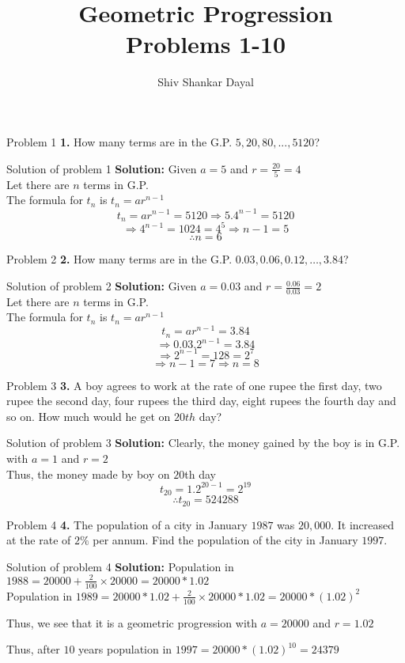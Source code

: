 \documentclass[aspectratio=1610,8pt]{beamer}
\title{Geometric Progression\\Problems 1-10}
\author[Shiv Shankar Dayal]{Shiv Shankar Dayal}
\begin{document}
\begin{frame}
       \titlepage
\end{frame}
\begin{frame}{Problem 1}
  \textbf{1.} How many terms are in the G.P. $5, 20, 80, ..., 5120$?
\end{frame}
\begin{frame}{Solution of problem 1}
  \textbf{Solution:} Given $a = 5$ and $r = \frac{20}{5} = 4$\\
  Let there are $n$ terms in G.P.\\
  The formula for $t_n$ is $t_n = ar^{n - 1}$
  $$t_n = ar^{n - 1} = 5120 \Rightarrow 5.4^{n - 1} = 5120$$
  $$\Rightarrow 4^{n - 1} = 1024 = 4^{5}\Rightarrow n - 1 = 5$$
  $$\therefore n = 6$$
\end{frame}
\begin{frame}{Problem 2}
  \textbf{2.} How many terms are in the G.P. $0.03, 0.06, 0.12, \ldots, 3.84$?
\end{frame}
\begin{frame}{Solution of problem 2}
  \textbf{Solution:} Given $a = 0.03$ and $r = \frac{0.06}{0.03} = 2$\\
  Let there are $n$ terms in G.P.\\
  The formula for $t_n$ is $t_n = ar^{n - 1}$
  $$t_n = ar^{n - 1} = 3.84$$
  $$\Rightarrow 0.03.2^{n - 1} = 3.84$$
  $$\Rightarrow 2^{n - 1} = 128 = 2^7$$
  $$\Rightarrow n -1 = 7 \Rightarrow n = 8$$
\end{frame}
\begin{frame}{Problem 3}
  \textbf{3.} A boy agrees to work at the rate of one rupee the first day, two
  rupee the second day, four rupees the third day, eight rupees the fourth day
  and so on. How much would he get on $20th$ day?
\end{frame}
\begin{frame}{Solution of problem 3}
  \textbf{Solution:} Clearly, the money gained by the boy is in G.P. with $a =
  1$ and $r = 2$\\
  Thus, the money made by boy on $20$th day $$t_{20} = 1.2^{20 -1} = 2^{19}$$
  $$\therefore t_{20} = 524288$$
\end{frame}
\begin{frame}{Problem 4}
  \textbf{4.} The population of a city in January $1987$ was $20,000$. It
  increased at the rate of $2\%$ per annum. Find the population of the city in
  January $1997$.
\end{frame}
\begin{frame}{Solution of problem 4}
  \textbf{Solution:} Population in $1988 = 20000 + \frac{2}{100}\times 20000 =
  20000 * 1.02$\\
  Population in $1989 = 20000*1.02 + \frac{2}{100}\times 20000 * 1.02 =
  20000*(1.02)^2$
  
  Thus, we see that it is a geometric progression with $a = 20000$ and $r =
  1.02$

  Thus, after $10$ years population in $1997 = 20000 * (1.02)^{10} = 24379$
\end{frame}
\end{document}

